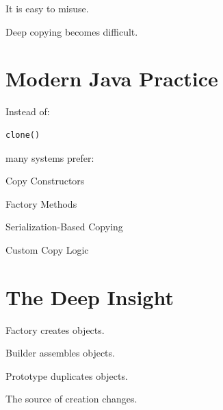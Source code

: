 \documentclass[11pt,a4paper]{book}
\begin{document}
It is easy to misuse.


Deep copying becomes difficult.


\section{Modern Java Practice}

Instead of:

\begin{verbatim}
clone()
\end{verbatim}

many systems prefer:


Copy Constructors


Factory Methods


Serialization-Based Copying


Custom Copy Logic


\section{The Deep Insight}

Factory creates objects.


Builder assembles objects.


Prototype duplicates objects.


The source of creation changes.
\end{document}
